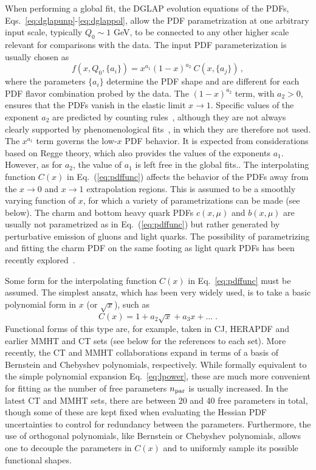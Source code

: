 When performing a global fit, the DGLAP evolution equations of the PDFs, 
Eqs.~\eqref{eq:dglapunp}-\eqref{eq:dglappol}, allow the PDF parametrization 
at one arbitrary input scale, typically $Q_0\sim 1$ GeV, to be connected to 
any other higher scale relevant for comparisons with the data.
%
The input PDF parameterization is usually chosen as
\begin{equation}
\label{eq:pdffunc}
f(x,Q_0,\{a_i\})= x^{a_1}(1-x)^{a_2}\:C(x,\{a_j\})\, ,
\end{equation}
where the parameters $\{a_i\}$ determine the PDF shape
and are different for each PDF flavor combination probed by the data.
%
The $(1-x)^{a_2}$ term, with $a_{2}>0$, ensures that the PDFs vanish in the 
elastic limit $x\to 1$. 
%
Specific values of the exponent $a_2$ are predicted by counting 
rules~\cite{Brodsky:1973kr}, although they are not always clearly
supported by phenomenological fits~\cite{Ball:2016spl,Nocera:2014uea}, 
in which they are therefore not used.
%
The $x^{a_1}$ term governs the low-$x$ PDF behavior. 
%
It is expected from considerations based on Regge theory, 
which also provides the values of the exponents $a_1$.
%
However, as for $a_2$, the value of $a_1$ is left free in the global fits..
%
The interpolating function $C(x)$ in Eq.~(\ref{eq:pdffunc})
affects the behavior of the PDFs away from the $x\to 0$ and $x\to 1$
extrapolation regions.
%
This is assumed to be a smoothly varying function of $x$, for which a variety 
of parametrizations can be made (see below).
%
The charm and bottom heavy quark PDFs $c(x,\mu)$ and $b(x,\mu)$ are usually not
parametrized as in  Eq.~(\ref{eq:pdffunc}) but rather
generated by perturbative emission of gluons and light quarks.
%
The possibility of parametrizing and fitting the charm PDF
on the same footing as light quark PDFs has been recently 
explored~\cite{Ball:2016neh}.

Some form for the interpolating function $C(x)$ in Eq.~\eqref{eq:pdffunc} 
must be assumed.
%
The simplest ansatz, which has been very widely used, is to take a basic 
polynomial form in $x$ (or $\sqrt{x}$), such as
\begin{equation}\label{eq:lpower}
C(x)=1+a_2\sqrt{x}+a_3 x+...\;.
\end{equation}
Functional forms of this type are, for example, taken in CJ, HERAPDF and 
earlier MMHT and CT sets (see below for the references to each set). 
%
More recently, the CT and MMHT collaborations expand 
in terms of a basis of  Bernstein and Chebyshev polynomials, respectively.
%
While formally equivalent to the simple polynomial expansion
Eq.~\eqref{eq:lpower}, these are much more convenient for fitting as the 
number of free parameters $n_{\rm par}$ is usually increased.
%
In the latest CT and MMHT sets, there are between 20 and 40 free parameters in 
total, though some of these are kept fixed when evaluating the
Hessian PDF uncertainties to control for redundancy between the parameters.
%
Furthermore, the use of orthogonal polynomials, like Bernstein or Chebyshev 
polynomials, allows one to decouple the parameters in $C(x)$ and to uniformly
sample its possible functional shapes.

